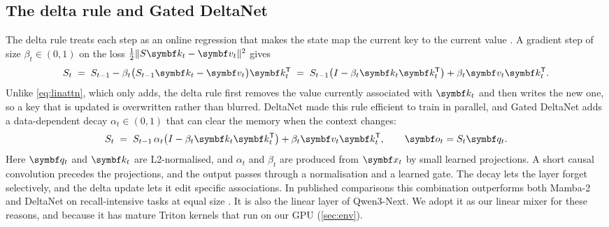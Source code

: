 \documentclass[10pt,a4paper]{article}
\begin{document}
\subsection{The delta rule and Gated DeltaNet}\label{sec:gdn}
The delta rule treats each step as an online regression that makes the state map the current key to
the current value \citep{schlag2021linear}. A gradient step of size $\beta_t\in(0,1)$ on the
loss $\tfrac12\lVert S\vect{k}_t-\vect{v}_t\rVert^2$ gives
\begin{equation}\label{eq:delta}
  S_t \;=\; S_{t-1} - \beta_t\big(S_{t-1}\vect{k}_t-\vect{v}_t\big)\vect{k}_t^{\T}
      \;=\; S_{t-1}\big(I-\beta_t\vect{k}_t\vect{k}_t^{\T}\big) + \beta_t\vect{v}_t\vect{k}_t^{\T}.
\end{equation}
Unlike \cref{eq:linattn}, which only adds, the delta rule first removes the value currently associated
with $\vect{k}_t$ and then writes the new one, so a key that is updated is overwritten rather than
blurred. DeltaNet \citep{yang2024deltanet} made this rule efficient to train in parallel, and
Gated DeltaNet \citep{yang2025gated} adds a data-dependent decay $\alpha_t\in(0,1)$ that can clear
the memory when the context changes:
\begin{equation}\label{eq:gdn}
  S_t \;=\; S_{t-1}\,\alpha_t\big(I-\beta_t\vect{k}_t\vect{k}_t^{\T}\big) + \beta_t\vect{v}_t\vect{k}_t^{\T},
  \qquad \vect{o}_t = S_t\vect{q}_t .
\end{equation}
Here $\vect{q}_t$ and $\vect{k}_t$ are L2-normalised, and $\alpha_t$ and $\beta_t$ are produced from
$\vect{x}_t$ by small learned projections. A short causal convolution precedes the projections, and
the output passes through a normalisation and a learned gate. The decay lets the layer forget
selectively, and the delta update lets it edit specific associations. In published comparisons this
combination outperforms both Mamba-2 and DeltaNet on recall-intensive tasks at equal size
\citep{yang2025gated}. It is also the linear layer of Qwen3-Next. We adopt it as our linear mixer for
these reasons, and because it has mature Triton kernels \citep{fla2024} that run on our GPU
(\cref{sec:env}).
\end{document}
